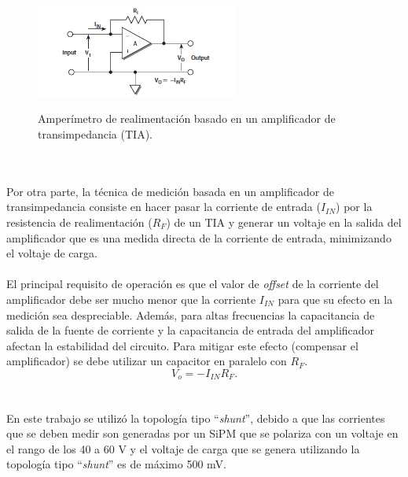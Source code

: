 \begin{figure}[h!]
\begin{centering}
    \caption{Amperímetro de realimentación basado en un amplificador de transimpedancia  (TIA). }
    \includegraphics[width=0.6\textwidth]{Images/feedback.png}
    \label{fig:feedback_circuit}
  \par\end{centering}
\end{figure}
\\ \\
Por otra parte, la técnica de medición basada en un amplificador de transimpedancia consiste en hacer pasar la corriente de entrada ($I_{IN}$) por la resistencia de realimentación ($R_F$) de un TIA y generar un voltaje en la salida del amplificador que es una medida directa de la corriente de entrada, minimizando el voltaje de carga. \\ \\
El principal requisito de operación es que el valor de \textit{offset} de la corriente del amplificador debe ser mucho menor que la corriente $I_{IN}$ para que su efecto en la medición sea despreciable. Además, para altas frecuencias la capacitancia de salida de la fuente de corriente y la capacitancia de entrada del amplificador afectan la estabilidad del circuito. Para mitigar este efecto (compensar el amplificador) se debe utilizar un capacitor en paralelo con $R_F$.    
\begin{equation}
    V_o= -I_{IN} R_F.
\end{equation}{}
\\ \\
En este trabajo se utilizó la topología tipo ``\textit{shunt}'', debido a que las corrientes que se deben medir son generadas por un SiPM que  se polariza con un voltaje en el rango de los 40 a 60 V y el voltaje de carga que se genera utilizando la topología tipo ``\textit{shunt}'' es de máximo 500 mV.%
